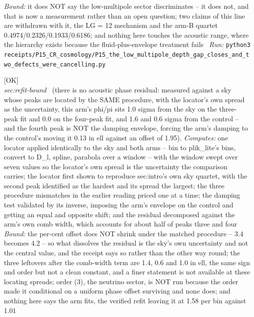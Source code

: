 \begin{description}
 \emph{Bound:} it does NOT say the low-multipole sector discriminates -- it does not, and that is now a measurement rather than an open question; two claims of this line are withdrawn with it, the LG = 12 mechanism and the arm-B quartet 0.4974/0.2326/0.1933/0.6186; and nothing here touches the acoustic range, where the hierarchy exists because the fluid-plus-envelope treatment fails
\ \emph{Run:} \texttt{python3 receipts/P15\_CR\_cosmology/P15\_the\_low\_multipole\_depth\_gap\_closes\_and\_two\_defects\_were\_cancelling.py}
\item[\rcptlabel{P15_there_is_no_phase_residual_and_the_fourth_peak_is_not_the_damping_envelope}{P15R172}\textbf{P15R172}\quad\texttt{P15\_there\_is\_no\_phase\_residual\_and\_the\_fourth\_peak\_is\_not\_the\_damping\_envelope}]\hfill\textsf{[OK]}\\
\textit{sec:refit-bound} \ (there is no acoustic phase residual: measured against a sky whose peaks are located by the SAME procedure, with the locator's own spread as the uncertainty, this arm's phi/pi sits 1.0 sigma from the sky on the three-peak fit and 0.0 on the four-peak fit, and 1.6 and 0.6 sigma from the control -- and the fourth peak is NOT the damping envelope, forcing the arm's damping to the control's moving it 0.13 in ell against an offset of 1.95). 
\emph{Computes:} one locator applied identically to the sky and both arms -- bin to plik\_lite's bins, convert to D\_l, spline, parabola over a window -- with the window swept over seven values so the locator's own spread is the uncertainty the comparison carries; the locator first shown to reproduce sec:intro's own sky quartet, with the second peak identified as the hardest and its spread the largest; the three procedure mismatches in the earlier reading priced one at a time; the damping test validated by its inverse, imposing the arm's envelope on the control and getting an equal and opposite shift; and the residual decomposed against the arm's own comb width, which accounts for about half of peaks three and four
 \emph{Bound:} the per-cent offset does NOT shrink under the matched procedure -- 3.4 becomes 4.2 -- so what dissolves the residual is the sky's own uncertainty and not the central value, and the receipt says so rather than the other way round; the three leftovers after the comb-width term are 1.4, 0.6 and 1.0 in ell, the same sign and order but not a clean constant, and a finer statement is not available at these locating spreads; order (3), the neutrino sector, is NOT run because the order made it conditional on a uniform phase offset surviving and none does; and nothing here says the arm fits, the verified refit leaving it at 1.58 per bin against 1.01

\end{description}
